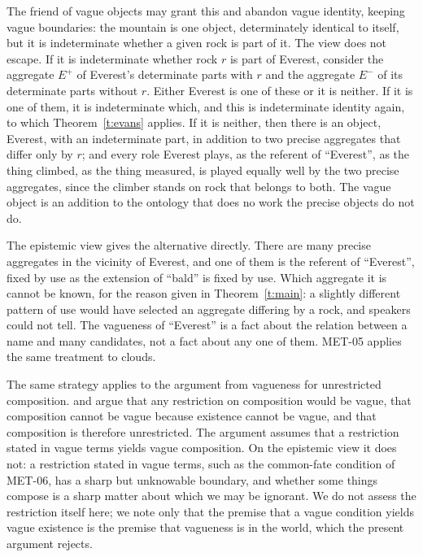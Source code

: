 \documentclass{situationist-preprint}
\begin{document}
The friend of vague objects may grant this and abandon vague identity, keeping vague boundaries: the mountain is one object, determinately identical to itself, but it is indeterminate whether a given rock is part of it. The view does not escape. If it is indeterminate whether rock $r$ is part of Everest, consider the aggregate $E^+$ of Everest's determinate parts with $r$ and the aggregate $E^-$ of its determinate parts without $r$. Either Everest is one of these or it is neither. If it is one of them, it is indeterminate which, and this is indeterminate identity again, to which Theorem~\ref{t:evans} applies. If it is neither, then there is an object, Everest, with an indeterminate part, in addition to two precise aggregates that differ only by $r$; and every role Everest plays, as the referent of \enquote{Everest}, as the thing climbed, as the thing measured, is played equally well by the two precise aggregates, since the climber stands on rock that belongs to both. The vague object is an addition to the ontology that does no work the precise objects do not do.

The epistemic view gives the alternative directly. There are many precise aggregates in the vicinity of Everest, and one of them is the referent of \enquote{Everest}, fixed by use as the extension of \enquote{bald} is fixed by use. Which aggregate it is cannot be known, for the reason given in Theorem~\ref{t:main}: a slightly different pattern of use would have selected an aggregate differing by a rock, and speakers could not tell. The vagueness of \enquote{Everest} is a fact about the relation between a name and many candidates, not a fact about any one of them. MET-05 applies the same treatment to clouds.

The same strategy applies to the argument from vagueness for unrestricted composition. \citet{Lewis1986} and \citet{Sider2001} argue that any restriction on composition would be vague, that composition cannot be vague because existence cannot be vague, and that composition is therefore unrestricted. The argument assumes that a restriction stated in vague terms yields vague composition. On the epistemic view it does not: a restriction stated in vague terms, such as the common-fate condition of MET-06, has a sharp but unknowable boundary, and whether some things compose is a sharp matter about which we may be ignorant. We do not assess the restriction itself here; we note only that the premise that a vague condition yields vague existence is the premise that vagueness is in the world, which the present argument rejects.
\end{document}
